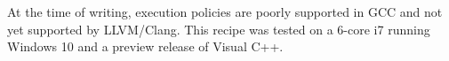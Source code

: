 \begin{tcolorbox}[colback=webgreen!5!white,colframe=webgreen!75!black,title=Note]
At the time of writing, execution policies are poorly supported in GCC and not yet supported by LLVM/Clang. This recipe was tested on a 6-core i7 running Windows 10 and a preview release of Visual C++.
\end{tcolorbox}

















